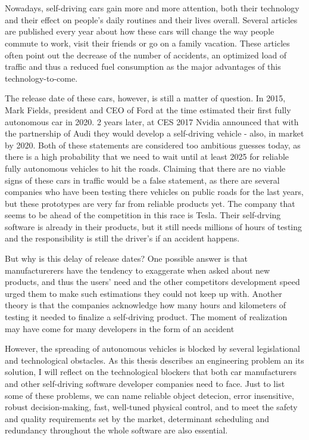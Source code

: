 \chapter{\bevezetes}

Nowadays, self-driving cars gain more and more attention, both their technology and their effect on people's daily routines and their lives overall. Several articles are published every year about how these cars will change the way people commute to work, visit their friends or go on a family vacation. These articles often point out the decrease of the number of accidents, an optimized load of traffic and thus a reduced fuel consumption as the major advantages of this technology-to-come.

The release date of these cars, however, is still a matter of question. In 2015, Mark Fields, president and CEO of Ford at the time estimated their first fully autonomous car in 2020. 2 years later, at CES 2017 Nvidia announced that with the partnership of Audi they would develop a self-driving vehicle - also, in market by 2020. Both of these statements are considered too ambitious guesses today, as there is a high probability that we need to wait until at least 2025 for reliable fully autonomous vehicles to hit the roads. Claiming that there are no viable signs of these cars in traffic would be a false statement, as there are several companies who have been testing there vehicles on public roads for the last years, but these prototypes are very far from reliable products yet. The company that seems to be ahead of the competition in this race is Tesla. Their self-drving software is already in their products, but it still needs millions of hours of testing and the responsibility is still the driver's if an accident happens.

But why is this delay of release dates? One possible answer is that manufacturerers have the tendency to exaggerate when asked about new products, and thus the users' need and the other competitors development speed urged them to make such estimations they could not keep up with. Another theory is that the companies acknowledge how many hours and kilometers of testing it needed to finalize a self-driving product. The moment of realization may have come for many developers in the form of an accident

However, the spreading of autonomous vehicles is blocked by several legislational and technological obstacles. As this thesis describes an engineering problem an its solution, I will reflect on the technological blockers that both car manufacturers and other self-driving software developer companies need to face. Just to list some of these problems, we can name reliable object detecion, error insensitive, robust decision-making, fast, well-tuned physical control, and to meet the safety and quality requirements set by the market, determinant scheduling and redundancy throughout the whole software are also essential.

 